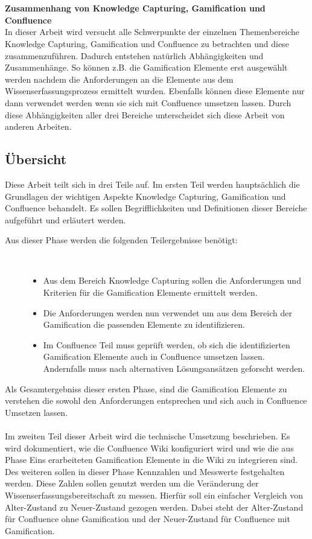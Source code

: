 \documentclass[a4paper,12pt,twoside]{scrartcl}
\begin{document}
\\\\
\textbf{Zusammenhang von Knowledge Capturing, Gamification und Confluence}\\
In dieser Arbeit wird versucht alle Schwerpunkte der einzelnen Themenbereiche Knowledge Capturing, Gamification und Confluence zu betrachten und diese zusammenzuführen. Dadurch entstehen natürlich Abhängigkeiten und Zusammenhänge. So können z.B. die Gamification Elemente erst ausgewählt werden nachdem die Anforderungen an die Elemente aus dem Wissenserfassungsprozess ermittelt wurden. Ebenfalls können diese Elemente nur dann verwendet werden wenn sie sich mit Confluence umsetzen lassen. Durch diese Abhängigkeiten aller drei Bereiche unterscheidet sich diese Arbeit von anderen Arbeiten.
\subsection{Übersicht}
Diese Arbeit teilt sich in drei Teile auf. Im ersten Teil werden hauptsächlich die Grundlagen der wichtigen Aspekte Knowledge Capturing, Gamification und Confluence behandelt. Es sollen Begrifflichkeiten und Definitionen dieser Bereiche aufgeführt und erläutert werden. 
\begin{description}
   \item[Aus dieser Phase werden die folgenden Teilergebnisse benötigt:]~\par
   \begin{itemize}
      \item Aus dem Bereich Knowledge Capturing sollen die Anforderungen und Kriterien für die Gamification Elemente ermittelt werden.
      \item Die Anforderungen werden nun verwendet um aus dem Bereich der Gamification die passenden Elemente zu identifizieren.
      \item Im Confluence Teil muss geprüft werden, ob sich die identifizierten Gamification Elemente auch in Confluence umsetzen lassen. Andernfalls muss nach alternativen Lösungsansätzen geforscht werden.
   \end{itemize}
\end{description}
Als Gesamtergebniss dieser ersten Phase, sind die Gamification Elemente zu verstehen die sowohl den Anforderungen entsprechen und sich auch in Confluence Umsetzen lassen.
\\\\
Im zweiten Teil dieser Arbeit wird die technische Umsetzung beschrieben. Es wird dokumentiert, wie die Confluence Wiki konfiguriert wird und wie die aus Phase Eins erarbeiteten Gamification Elemente in die Wiki zu integrieren sind. Des weiteren sollen in dieser Phase Kennzahlen und Messwerte festgehalten werden. Diese Zahlen sollen genutzt werden um die Veränderung der Wissenserfassungsbereitschaft zu messen. Hierfür soll ein einfacher Vergleich von Alter-Zustand zu Neuer-Zustand gezogen werden. Dabei steht der Alter-Zustand für Confluence ohne Gamification und der Neuer-Zustand für Confluence mit Gamification.
\end{document}
